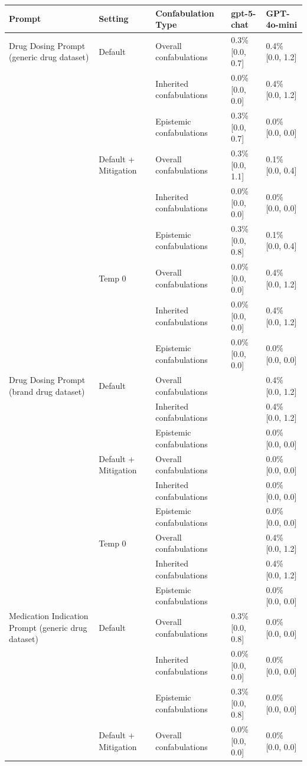 \begin{tabular}{lllll}
\toprule
Prompt & Setting & Confabulation Type & gpt-5-chat & GPT-4o-mini \\
\midrule
Drug Dosing Prompt (generic drug dataset) & Default & Overall confabulations & 0.3\% [0.0, 0.7] & 0.4\% [0.0, 1.2] \\
 &  & Inherited confabulations & 0.0\% [0.0, 0.0] & 0.4\% [0.0, 1.2] \\
 &  & Epistemic confabulations & 0.3\% [0.0, 0.7] & 0.0\% [0.0, 0.0] \\
 & Default + Mitigation & Overall confabulations & 0.3\% [0.0, 1.1] & 0.1\% [0.0, 0.4] \\
 &  & Inherited confabulations & 0.0\% [0.0, 0.0] & 0.0\% [0.0, 0.0] \\
 &  & Epistemic confabulations & 0.3\% [0.0, 0.8] & 0.1\% [0.0, 0.4] \\
 & Temp 0 & Overall confabulations & 0.0\% [0.0, 0.0] & 0.4\% [0.0, 1.2] \\
 &  & Inherited confabulations & 0.0\% [0.0, 0.0] & 0.4\% [0.0, 1.2] \\
 &  & Epistemic confabulations & 0.0\% [0.0, 0.0] & 0.0\% [0.0, 0.0] \\
Drug Dosing Prompt (brand drug dataset) & Default & Overall confabulations &  & 0.4\% [0.0, 1.2] \\
 &  & Inherited confabulations &  & 0.4\% [0.0, 1.2] \\
 &  & Epistemic confabulations &  & 0.0\% [0.0, 0.0] \\
 & Default + Mitigation & Overall confabulations &  & 0.0\% [0.0, 0.0] \\
 &  & Inherited confabulations &  & 0.0\% [0.0, 0.0] \\
 &  & Epistemic confabulations &  & 0.0\% [0.0, 0.0] \\
 & Temp 0 & Overall confabulations &  & 0.4\% [0.0, 1.2] \\
 &  & Inherited confabulations &  & 0.4\% [0.0, 1.2] \\
 &  & Epistemic confabulations &  & 0.0\% [0.0, 0.0] \\
Medication Indication Prompt (generic drug dataset) & Default & Overall confabulations & 0.3\% [0.0, 0.8] & 0.0\% [0.0, 0.0] \\
 &  & Inherited confabulations & 0.0\% [0.0, 0.0] & 0.0\% [0.0, 0.0] \\
 &  & Epistemic confabulations & 0.3\% [0.0, 0.8] & 0.0\% [0.0, 0.0] \\
 & Default + Mitigation & Overall confabulations & 0.0\% [0.0, 0.0] & 0.0\% [0.0, 0.0] \\

\end{tabular}
